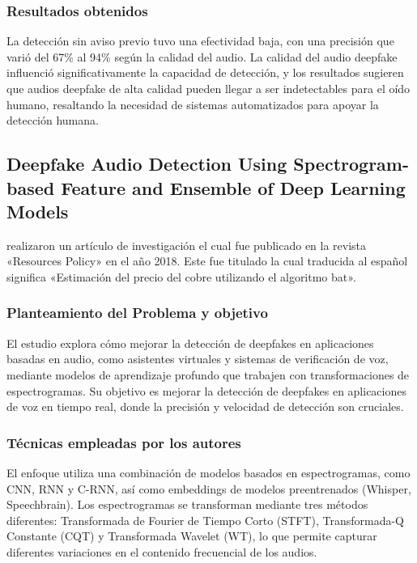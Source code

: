 \subsubsection{Resultados obtenidos}
La detección sin aviso previo tuvo una efectividad baja, con una precisión que varió del 67\% al 94\% según la calidad del audio. La calidad del audio deepfake influenció significativamente la capacidad de detección, y los resultados sugieren que audios deepfake de alta calidad pueden llegar a ser indetectables para el oído humano, resaltando la necesidad de sistemas automatizados para apoyar la detección humana.

\subsection{Deepfake Audio Detection Using Spectrogram-based Feature and Ensemble of Deep Learning Models \citep*{pr_dehghani2018copper}}
\citeauthor{pr_dehghani2018copper} realizaron un artículo de investigación el cual fue publicado en la revista «Resources Policy» en el año 2018. Este fue titulado  la cual traducida al español significa «Estimación del precio del cobre utilizando el algoritmo bat».

\subsubsection{Planteamiento del Problema y objetivo }
El estudio explora cómo mejorar la detección de deepfakes en aplicaciones basadas en audio, como asistentes virtuales y sistemas de verificación de voz, mediante modelos de aprendizaje profundo que trabajen con transformaciones de espectrogramas. Su objetivo es mejorar la detección de deepfakes en aplicaciones de voz en tiempo real, donde la precisión y velocidad de detección son cruciales.

\subsubsection{Técnicas empleadas por los autores}
El enfoque utiliza una combinación de modelos basados en espectrogramas, como CNN, RNN y C-RNN, así como embeddings de modelos preentrenados (Whisper, Speechbrain). Los espectrogramas se transforman mediante tres métodos diferentes: Transformada de Fourier de Tiempo Corto (STFT), Transformada-Q Constante (CQT) y Transformada Wavelet (WT), lo que permite capturar diferentes variaciones en el contenido frecuencial de los audios.

